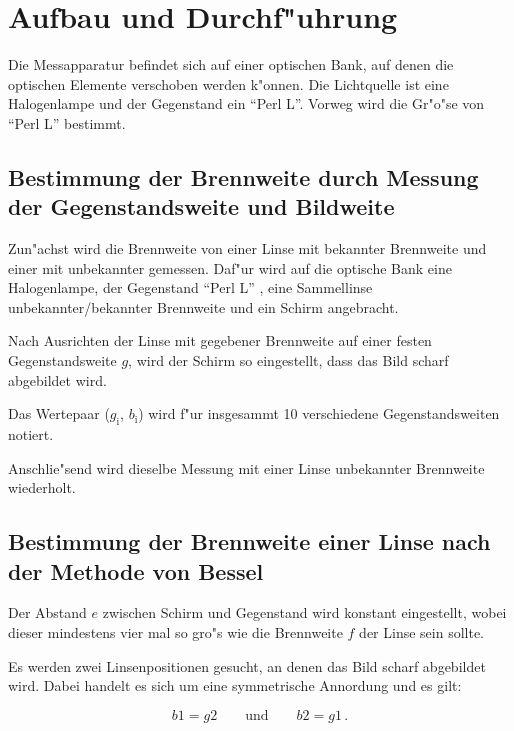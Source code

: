 \section{Aufbau und Durchf"uhrung}
	\label{sec:durchfuehrung}

	Die Messapparatur befindet sich auf einer optischen Bank, auf denen die optischen Elemente verschoben werden k"onnen.
	Die Lichtquelle ist eine Halogenlampe und der Gegenstand ein "`Perl L"'.
	Vorweg wird die Gr"o"se von "`Perl L"' bestimmt.

	\subsection{Bestimmung der Brennweite durch Messung der Gegenstandsweite und Bildweite} %
		\label{sub:bestimmung_der_brennweite_durch_messung_der_gegenstandsweite_und_bildweite}
		
		Zun"achst wird die Brennweite von einer Linse mit bekannter Brennweite und einer mit unbekannter gemessen.
		Daf"ur wird auf die optische Bank eine Halogenlampe, der Gegenstand "`Perl L"' , eine Sammellinse unbekannter/bekannter Brennweite und ein Schirm angebracht.

		Nach Ausrichten der Linse mit gegebener Brennweite auf einer festen Gegenstandsweite $g$, wird der Schirm so eingestellt, dass das Bild scharf abgebildet wird.

		Das Wertepaar ($g_\mathrm{i}$, $b_\mathrm{i}$) wird f"ur insgesammt 10 verschiedene Gegenstandsweiten notiert.

		Anschlie"send wird dieselbe Messung mit einer Linse unbekannter Brennweite wiederholt.

	\subsection{Bestimmung der Brennweite einer Linse nach der Methode von Bessel} %
		\label{sub:bestimmung_der_brennweite_einer_linse_nach_der_methode_von_bessel}
		
		Der Abstand $e$ zwischen Schirm und Gegenstand wird konstant eingestellt, wobei dieser mindestens vier mal so gro"s wie die Brennweite $f$ der Linse sein sollte.

		Es werden zwei Linsenpositionen gesucht, an denen das Bild scharf abgebildet wird. Dabei handelt es sich um eine symmetrische Annordung und es gilt:

		\begin{equation}
			b1 = g2 \qquad \text{und} \qquad b2 = g1\, . \nonumber
		\end{equation}

